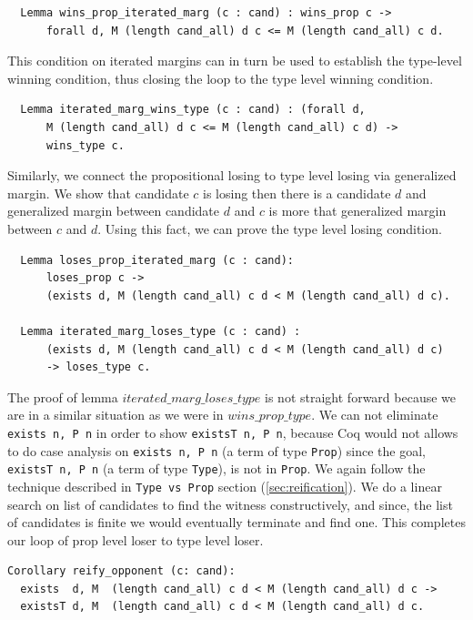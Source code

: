 \begin{verbatim}
  Lemma wins_prop_iterated_marg (c : cand) : wins_prop c ->
      forall d, M (length cand_all) d c <= M (length cand_all) c d.
\end{verbatim}

\noindent
This condition on iterated margins can in turn be used to establish the
type-level winning condition, thus closing the loop to the type
level winning condition.

\begin{verbatim}
  Lemma iterated_marg_wins_type (c : cand) : (forall d,
      M (length cand_all) d c <= M (length cand_all) c d) ->
      wins_type c.
\end{verbatim}

Similarly, we connect the propositional losing to type level losing via generalized margin. We show that 
candidate $c$ is losing then there is a candidate $d$ and generalized margin between candidate $d$ and 
$c$ is more that generalized margin between $c$ and $d$.  Using this fact, we can prove the 
type level losing condition. 

\begin{verbatim} 
  Lemma loses_prop_iterated_marg (c : cand):
      loses_prop c ->
      (exists d, M (length cand_all) c d < M (length cand_all) d c).

  Lemma iterated_marg_loses_type (c : cand) :
      (exists d, M (length cand_all) c d < M (length cand_all) d c) 
      -> loses_type c.
\end{verbatim}


The proof of lemma  $iterated\_marg\_loses\_type$ is not straight forward because
we are in a similar situation  as we were in $wins\_prop\_type$. 
We can not eliminate \texttt{exists n, P n} in order to show \texttt{existsT n, P n},
because Coq would not allows to do case analysis on \texttt{exists n, P n} (a term of 
type \texttt{Prop}) since the goal, \texttt{existsT n, P n} (a term of type \texttt{Type}), is not in
\texttt{Prop}. We again follow the technique described in 
\texttt{Type vs Prop} section (\ref{sec:reification}).
We do  a linear search on list of candidates  to find the witness constructively, and since, 
the list of candidates is  finite we would eventually terminate and find one.  
This completes our loop of prop level loser to type level loser. 


\begin{verbatim}
Corollary reify_opponent (c: cand):
  exists  d, M  (length cand_all) c d < M (length cand_all) d c ->
  existsT d, M  (length cand_all) c d < M (length cand_all) d c.
\end{verbatim}



